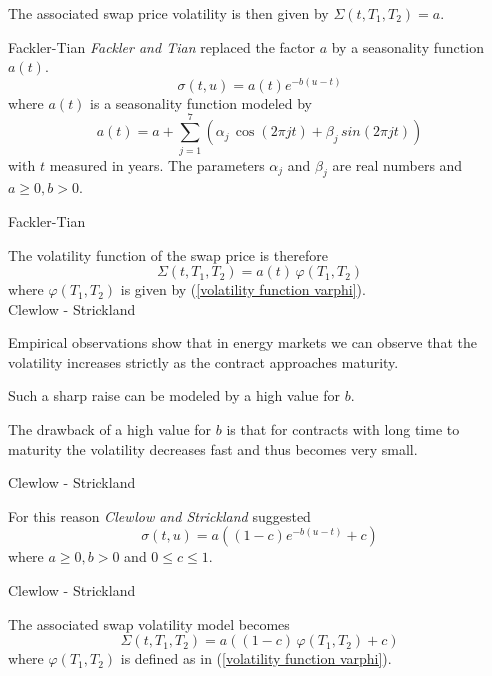 The associated swap price volatility is then given by $\Sigma(t,T_1,T_2)=a$.

{Fackler-Tian}
\emph{Fackler and Tian}  replaced the factor $a$ by a seasonality function $a(t)$.
\begin{equation}
\sigma(t,u) = a(t)e^{-b(u-t)}
\end{equation}
where $a(t)$ is a seasonality function modeled by
\begin{equation}
a(t)=a+\sum_{j=1}^{7}(\alpha_j\, \cos(2\pi jt)+ \beta_j \, sin(2\pi jt)) \label{seasonality function}
\end{equation}
with $t$  measured in years. The parameters $\alpha_j$ and $\beta_j$ are real numbers and $a \ge 0, b > 0$.

{Fackler-Tian}

The volatility function of the swap price is therefore
\begin{equation}
\Sigma(t,T_1,T_2)=a(t)\, \varphi(T_1,T_2)
\end{equation}
where $\varphi(T_1,T_2)$ is given by (\ref{volatility function varphi}).\\

{Clewlow - Strickland}


	Empirical observations show that in energy markets we can observe that the volatility increases strictly as the contract approaches maturity.

	Such a sharp raise can be modeled by a high value for $b$.

	The drawback of a high value for $b$ is that for contracts with long time to maturity the volatility decreases fast and thus becomes very small.


{Clewlow - Strickland}

For this reason \emph{Clewlow and Strickland} suggested
\begin{equation}
\sigma(t,u)=a((1-c)e^{-b(u-t)}+c) \label{Strickland model}
\end{equation}
where $a\ge 0, b > 0$ and $ 0 \le c\le 1$.

{Clewlow - Strickland}

The associated swap volatility model becomes
\begin{equation}
\Sigma(t,T_1,T_2)=a((1-c)\,\varphi(T_1,T_2)+c)
\end{equation}
where $\varphi(T_1,T_2)$ is defined as in (\ref{volatility function varphi}).\\

